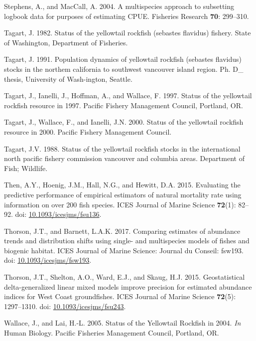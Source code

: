 \documentclass[12pt,]{article}
\begin{document}
\hypertarget{ref-Stephens2004}{}
Stephens, A., and MacCall, A. 2004. A multispecies approach to
subsetting logbook data for purposes of estimating CPUE. Fisheries
Research \textbf{70}: 299--310.

\hypertarget{ref-Tagart1982}{}
Tagart, J. 1982. Status of the yellowtail rockfish (sebastes flavidus)
fishery. State of Washington, Department of Fisheries.

\hypertarget{ref-Tagart1991}{}
Tagart, J. 1991. Population dynamics of yellowtail rockfish (sebastes
flavidus) stocks in the northem california to southwest vancouver island
region. Ph. D\_ thesis, University of Wash-ington, Seattle.

\hypertarget{ref-Tagart1997}{}
Tagart, J., Ianelli, J., Hoffman, A., and Wallace, F. 1997. Status of
the yellowtail rockfish resource in 1997. Pacific Fishery Management
Council, Portland, OR.

\hypertarget{ref-Tagart2000}{}
Tagart, J., Wallace, F., and Ianelli, J.N. 2000. Status of the
yellowtail rockfish resource in 2000. Pacific Fishery Management
Council.

\hypertarget{ref-Tagart1988}{}
Tagart, J.V. 1988. Status of the yellowtail rockfish stocks in the
international north pacific fishery commission vancouver and columbia
areas. Department of Fish; Wildlife.

\hypertarget{ref-Then2015}{}
Then, A.Y., Hoenig, J.M., Hall, N.G., and Hewitt, D.A. 2015. Evaluating
the predictive performance of empirical estimators of natural mortality
rate using information on over 200 fish species. ICES Journal of Marine
Science \textbf{72}(1): 82--92. doi:
\href{https://doi.org/10.1093/icesjms/fsu136}{10.1093/icesjms/fsu136}.

\hypertarget{ref-Thorson2017}{}
Thorson, J.T., and Barnett, L.A.K. 2017. Comparing estimates of
abundance trends and distribution shifts using single- and multispecies
models of fishes and biogenic habitat. ICES Journal of Marine Science:
Journal du Conseil: fsw193. doi:
\href{https://doi.org/10.1093/icesjms/fsw193}{10.1093/icesjms/fsw193}.

\hypertarget{ref-Thorson2015}{}
Thorson, J.T., Shelton, A.O., Ward, E.J., and Skaug, H.J. 2015.
Geostatistical delta-generalized linear mixed models improve precision
for estimated abundance indices for West Coast groundfishes. ICES
Journal of Marine Science \textbf{72}(5): 1297--1310. doi:
\href{https://doi.org/10.1093/icesjms/fsu243}{10.1093/icesjms/fsu243}.

\hypertarget{ref-Wallace2005}{}
Wallace, J., and Lai, H.-L. 2005. Status of the Yellowtail Rockfish in
2004. \emph{In} Human Biology. Pacific Fisheries Management Council,
Portland, OR.
\end{document}
